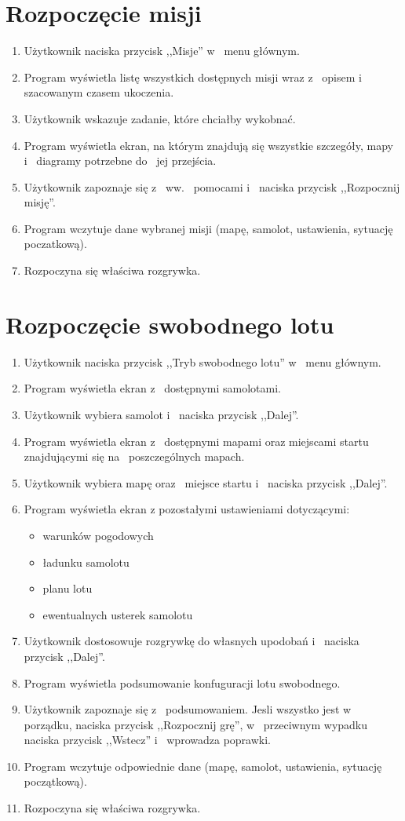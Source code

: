 \documentclass{mwrep}
\begin{document}
\section{Rozpoczęcie misji}
\begin{enumerate}
  \item Użytkownik naciska przycisk ,,Misje'' w~ menu głównym.
  \item Program wyświetla listę wszystkich dostępnych misji wraz z~ opisem i~ szacowanym czasem ukoczenia.
  \item Użytkownik wskazuje zadanie, które chciałby wykobnać.
  \item Program wyświetla ekran, na którym znajdują się wszystkie szczegóły, mapy i~ diagramy potrzebne do~ jej przejścia.
  \item Użytkownik zapoznaje się z~ ww.~ pomocami i~ naciska przycisk ,,Rozpocznij misję''.
  \item Program wczytuje dane wybranej misji (mapę, samolot, ustawienia, sytuację poczatkową).
  \item Rozpoczyna się właściwa rozgrywka.
\end{enumerate}

\section{Rozpoczęcie swobodnego lotu}
\begin{enumerate}
  \item Użytkownik naciska przycisk ,,Tryb swobodnego lotu'' w~ menu głównym.
  \item Program wyświetla ekran z~ dostępnymi samolotami.
  \item Użytkownik wybiera samolot i~ naciska przycisk ,,Dalej''.
  \item Program wyświetla ekran z~ dostępnymi mapami oraz miejscami startu znajdującymi się na~ poszczególnych mapach.
  \item Użytkownik wybiera mapę oraz~ miejsce startu i~ naciska przycisk ,,Dalej''.
  \item Program wyświetla ekran z pozostałymi ustawieniami dotyczącymi:
  \begin{itemize}
    \item warunków pogodowych
    \item ładunku samolotu
    \item planu lotu
    \item ewentualnych usterek samolotu
  \end{itemize}
  \item Użytkownik dostosowuje rozgrywkę do własnych upodobań i~ naciska przycisk ,,Dalej''.
  \item Program wyświetla podsumowanie konfuguracji lotu swobodnego.
  \item Użytkownik zapoznaje się z~ podsumowaniem. Jesli wszystko jest w~ porządku, naciska przycisk ,,Rozpocznij grę'', w~ przeciwnym wypadku naciska przycisk ,,Wstecz'' i~ wprowadza poprawki.
  \item Program wczytuje odpowiednie dane (mapę, samolot, ustawienia, sytuację początkową).
  \item Rozpoczyna się właściwa rozgrywka.
\end{enumerate}
\end{document}
